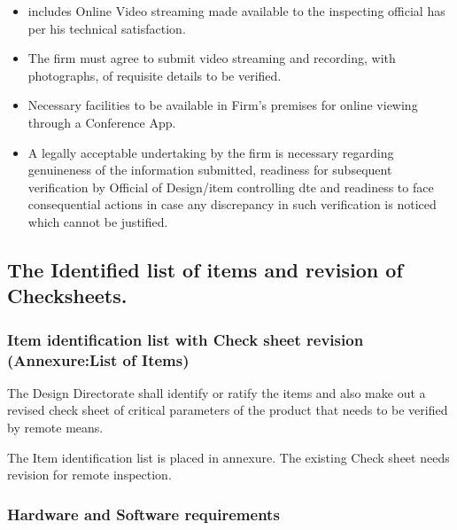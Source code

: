 \documentclass[
]{article}
\providecommand{\tightlist}{%
  \setlength{\itemsep}{0pt}\setlength{\parskip}{0pt}}
\begin{document}
\begin{itemize}
\tightlist
\item
  includes Online Video streaming made available to the inspecting
  official has per his technical satisfaction.
\item
  The firm must agree to submit video streaming and recording, with
  photographs, of requisite details to be verified.
\item
  Necessary facilities to be available in Firm's premises for online
  viewing through a Conference App.
\item
  A legally acceptable undertaking by the firm is necessary regarding
  genuineness of the information submitted, readiness for subsequent
  verification by Official of Design/item controlling dte and readiness
  to face consequential actions in case any discrepancy in such
  verification is noticed which cannot be justified.
\end{itemize}

\hypertarget{the-identified-list-of-items-and-revision-of-checksheets.}{%
\subsection{The Identified list of items and revision of
Checksheets.}\label{the-identified-list-of-items-and-revision-of-checksheets.}}

\hypertarget{item-identification-list-with-check-sheet-revision-annexurelist-of-items}{%
\subsubsection{Item identification list with Check sheet revision
(Annexure:List of
Items)}\label{item-identification-list-with-check-sheet-revision-annexurelist-of-items}}

The Design Directorate shall identify or ratify the items and also make
out a revised check sheet of critical parameters of the product that
needs to be verified by remote means.

The Item identification list is placed in annexure. The existing Check
sheet needs revision for remote inspection.

\hypertarget{hardware-and-software-requirements}{%
\subsubsection{Hardware and Software
requirements}\label{hardware-and-software-requirements}}
\end{document}
